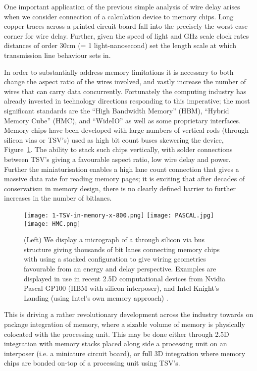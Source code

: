 \documentclass{PoS}
\begin{document}
One important application of the previous simple analysis of wire delay arises when we consider connection of a
calculation device to memory chips. Long copper traces across a printed circuit board fall into the precisely
the worst case corner for wire delay. Further, given the speed of light and GHz scale clock rates 
distances of order 30cm (= 1 light-nanosecond) set the length scale at which transmission line behaviour
sets in. 

In order to substantially address memory limitations it is necessary to both change the aspect ratio of the wires
involved, and vastly increase the number of wires that can carry data concurrently.
Fortunately the computing industry has already invested in technology directions responding to this imperative;
the most significant standards are the ``High Bandwidth Memory'' (HBM), ``Hybrid Memory Cube'' (HMC), and ``WideIO''
as well as some proprietary interfaces.
%
Memory chips have been developed with large numbers of vertical rods (through silicon vias or TSV's) used as high bit count buses skewering 
the device, Figure~\ref{fig:TSV}. The ability to stack such chips vertically, with solder connections between TSV's giving a favourable aspect ratio,
low wire delay and power. Further the miniaturisation enables a high lane count connection that gives a massive data rate for reading memory pages;
it is exciting that after decades of conservatism in memory design, there is no clearly defined barrier to further increases in the number of bitlanes.

\begin{figure}[hbt]
\texttt{[image: 1-TSV-in-memory-x-800.png]}\hspace{0.2cm}
\texttt{[image: PASCAL.jpg]}\hspace{0.2cm}
\texttt{[image: HMC.png]}
\caption{ \label{fig:TSV} (Left) We display a micrograph of a through silicon via bus structure giving thousands of bit lanes
connecting memory chips with using a stacked configuration to give wiring geometries favourable from an energy and delay perspective.
Examples are displayed in use in recent 2.5D computational devices from Nvidia Pascal GP100 (HBM with silicon interposer)\cite{gp100}, and Intel Knight's
Landing (using Intel's own memory approach) \cite{KNLbook}.
}
\end{figure}

This is driving a rather revolutionary development across the industry towards on package integration of memory,
where a sizable volume of memory is physically colocated with the processing unit.
This may be done either through 2.5D integration with memory stacks placed along side a processing unit
on an interposer (i.e. a miniature circuit board), or full 3D integration where memory chips are bonded on-top
of a processing unit using TSV's.
\end{document}
